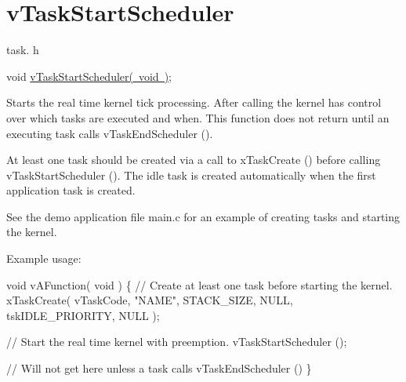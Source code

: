 \hypertarget{group__v_task_start_scheduler}{}\section{v\+Task\+Start\+Scheduler}
\label{group__v_task_start_scheduler}
task. h 
\begin{DoxyPre}void \mbox{\hyperlink{task_8h_aaf9dca1065c60abdeb309d56ab7293cb}{vTaskStartScheduler( void )}};\end{DoxyPre}


Starts the real time kernel tick processing. After calling the kernel has control over which tasks are executed and when. This function does not return until an executing task calls v\+Task\+End\+Scheduler ().

At least one task should be created via a call to x\+Task\+Create () before calling v\+Task\+Start\+Scheduler (). The idle task is created automatically when the first application task is created.

See the demo application file main.\+c for an example of creating tasks and starting the kernel.

Example usage\+: 
\begin{DoxyPre}
void vAFunction( void )
\{
    // Create at least one task before starting the kernel.
    xTaskCreate( vTaskCode, "NAME", STACK\_SIZE, NULL, tskIDLE\_PRIORITY, NULL );\end{DoxyPre}



\begin{DoxyPre}    // Start the real time kernel with preemption.
    vTaskStartScheduler ();\end{DoxyPre}



\begin{DoxyPre}    // Will not get here unless a task calls vTaskEndScheduler ()
\}
  \end{DoxyPre}
 